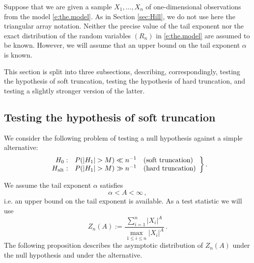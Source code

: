 \documentclass[11pt]{amsart}
\numberwithin{equation}{section}
\begin{document}
Suppose  that we are given a sample
$X_1,\ldots, X_n$ of  one-dimensional observations from the
model  \eqref{e:the.model}. As in Section \ref{sec:Hill}, we do not use
here the triangular array notation. Neither
the precise value of the tail exponent nor the exact distribution of
the random variables $(R_n)$ in  \eqref{e:the.model} are assumed to be
known. However, we will assume that an upper bound on the tail
exponent $\alpha$ is known.

This section is split into three subsections, describing,
correspondingly, testing the hypothesis of soft truncation,
testing the hypothesis of hard truncation, and testing a slightly
stronger version of the latter.

\subsection{Testing the hypothesis of soft truncation}\label{test1}

We consider the following problem of testing a null hypothesis against
a simple alternative:
\begin{equation}\label{hypo2}
\left.\begin{array}{rcl}
H_0:&P(|H_1|>M)\ll n^{-1}&\mbox{(soft truncation)}\\
H_{\rm alt}:&P(|H_1|>M)\gg n^{-1}&\mbox{(hard truncation)}
\end{array}\right\}.
\end{equation}

We assume the tail exponent $\alpha$ satisfies
\begin{equation} \label{e:upper.b.alpha}
\alpha<A<\infty\,,
\end{equation}
i.e. an upper bound on the tail exponent is available.  As a test
statistic we will use
\begin{equation} \label{e:test.stat.1}
Z_n(A):=\frac{\sum_{i=1}^n|X_i|^A}{\max_{1\le i\le n}|X_i|^A}\,.
\end{equation}
The following proposition describes the asymptotic distribution of $Z_n(A)$
under the null hypothesis and under the alternative.
\end{document}
